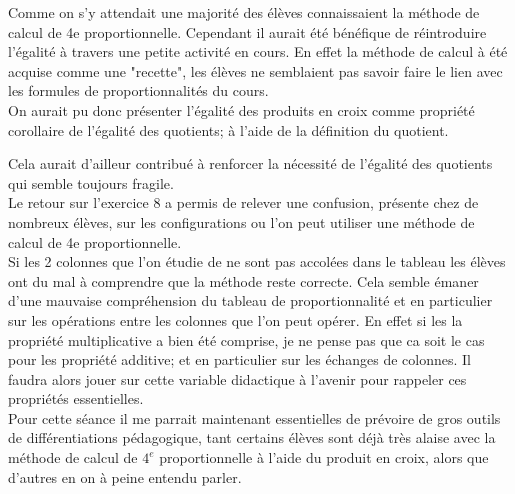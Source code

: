 Comme on s'y attendait une majorité des élèves connaissaient la méthode de calcul de 4e proportionnelle.
Cependant il aurait été bénéfique de réintroduire l'égalité à travers une petite activité en cours.
En effet la méthode de calcul à été acquise comme une "recette",
les élèves ne semblaient pas savoir faire le lien avec les formules de proportionnalités du cours.\\
On aurait pu donc présenter l'égalité des produits en croix comme propriété corollaire de l'égalité des quotients;
à l'aide de la définition du quotient.


Cela aurait d'ailleur contribué à renforcer la nécessité de l'égalité des quotients qui semble toujours fragile.\\

Le retour sur l'exercice 8 a permis de relever une confusion,
présente chez de nombreux élèves,
sur les configurations ou l'on peut utiliser une méthode de calcul de 4e proportionnelle.\\
Si les 2 colonnes que l'on étudie de ne sont pas accolées dans le tableau les élèves ont du mal à comprendre que la méthode reste correcte.
Cela semble émaner d'une mauvaise compréhension du tableau de proportionnalité et en particulier sur les opérations entre les colonnes que l'on peut opérer.
En effet si les la propriété multiplicative a bien été comprise, je ne pense pas que ca soit le cas pour les propriété additive;
et en particulier sur les échanges de colonnes.
Il faudra alors jouer sur cette variable didactique à l'avenir pour rappeler ces propriétés essentielles.\\

Pour cette séance il me parrait maintenant essentielles de prévoire de gros outils de différentiations pédagogique,
tant certains élèves sont déjà très alaise avec la méthode de calcul de $4^e$ proportionnelle à l'aide du produit en croix,
alors que d'autres en on à peine entendu parler.